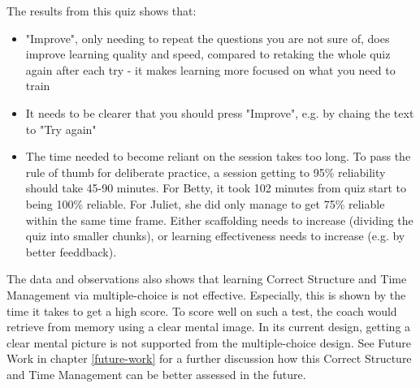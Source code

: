   The results from this quiz shows that:
  \begin{itemize}
  \item "Improve", only needing to repeat the questions you are not sure of, does improve learning quality and speed, compared to retaking the whole quiz again after each try - it makes learning more focused on what you need to train
  \item It needs to be clearer that you should press "Improve", e.g. by chaing the text to "Try again"
  \item The time needed to become reliant on the session takes too long. To pass the rule of thumb for deliberate practice, a session getting to 95\% reliability should take 45-90 minutes. For Betty, it took 102 minutes from quiz start to being 100\% reliable. For Juliet, she did only manage to get 75\% reliable within the same time frame. Either scaffolding needs to increase (dividing the quiz into smaller chunks), or learning effectiveness needs to increase (e.g. by better feeddback).
  \end{itemize}

The data and observations also shows that learning Correct Structure and Time Management via multiple-choice is not effective. Especially, this is shown by the time it takes to get a high score. To score well on such a test, the coach would retrieve from memory using a clear mental image. In its current design, getting a clear mental picture is not supported from the multiple-choice design. See Future Work in chapter \ref{future-work} for a further discussion how this Correct Structure and Time Management can be better assessed in the future.
